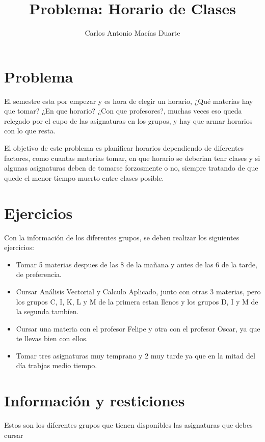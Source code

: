 \documentclass[10pt,letterpaper,twoside,openright]{article}
\author{Carlos Antonio Macías Duarte}
\title{Problema: Horario de Clases}
\begin{document}
	\maketitle

	\section{Problema}
	
	El semestre esta por empezar y es hora de elegir un horario, ¿Qué materias hay que tomar? ¿En que horario? ¿Con que profesores?, muchas veces eso queda relegado por el cupo de las asignaturas en los grupos, y hay que armar horarios con lo que resta.
	
	El objetivo de este problema es planificar horarios dependiendo de diferentes factores, como cuantas materias tomar, en que horario se deberian tenr clases y si algunas asignaturas deben de tomarse forzosmente o no, siempre tratando de que quede el menor tiempo muerto entre clases posible.

	\section{Ejercicios}
	
	Con la información de los diferentes grupos, se deben realizar los siguientes ejercicios:
	
	\begin{itemize}
		\item Tomar 5 materias despues de las 8 de la mañana y antes de las 6 de la tarde, de preferencia.
		\item Cursar Análisis Vectorial y Calculo Aplicado, junto con otras 3 materias, pero los grupos C, I, K, L y M de la primera estan llenos y los grupos D, I y M de la segunda tambíen. 
		\item Cursar una materia con el profesor Felipe y otra con el profesor Oscar, ya que te llevas bien con ellos.
		\item Tomar tres asignaturas muy temprano y 2 muy tarde ya que en la mitad del día trabjas medio tiempo.
	\end{itemize}

	\section{Información y resticiones}

	Estos son los diferentes grupos que tienen disponibles las asignaturas que debes cursar
\end{document}
